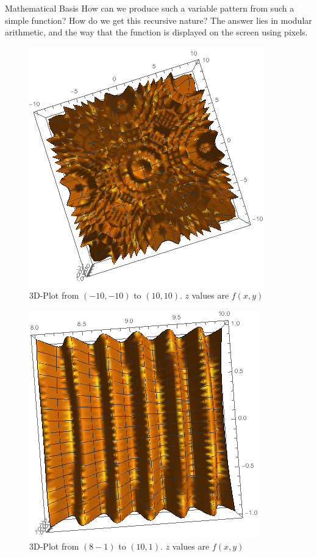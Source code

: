 \documentclass[11pt]{article}
\begin{document}
\clearpage
\begin{section}{Mathematical Basis}
How can we produce such a variable pattern from such a simple function? How do we get this recursive nature? The answer lies in modular arithmetic, and the way that the function is displayed on the screen using pixels.\\

\begin{figure}[h]
\centering
\includegraphics[width=.7\textwidth]{plot3d1.png}
\caption{3D-Plot from $(-10, -10)$ to $(10, 10)$. $z$ values are $f(x, y)$}
\label{fig:wolfFar}
\end{figure}
\begin{figure}[h]
\centering
\includegraphics[width=.7\textwidth]{plot3d2.png}
\caption{3D-Plot from $(8 -1)$ to $(10, 1)$. $z$ values are $f(x, y)$}
\label{fig:wolfClose}
\end{figure}


\end{section}
\end{document}
